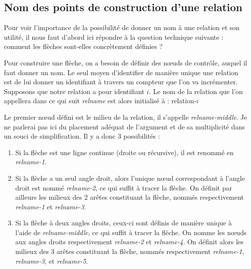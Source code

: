 \documentclass[a4paper,11pt]{report}
\newcommand{\inputTikZ}[1]{%
  }%
\newcommand{\inputTikZ}[1]{%
    \texttt{[image: fig/\#1.pdf]}%
  }%
\begin{document}
\subsection{Nom des points de construction d'une relation}\label{ss.relptname}

Pour voir l'importance de la possibilité de donner un nom à une relation et son utilité, il nous faut d'abord ici répondre à la question technique suivante : comment les flèches sont-elles concrètement définies ?

Pour construire une flèche, on a besoin de définir des n\oe{}uds de contrôle, auquel il faut donner un nom. Le seul moyen d'identifier de manière unique une relation est de lui donner un identifiant à travers un compteur que l'on va incrémenter. Supposons que notre relation a pour identifiant $i$. Le nom de la relation que l'on appellera dans ce qui suit {\it relname} est alors initialisé à : relation-$i$

Le premier n\oe{}ud défini est le milieu de la relation, il s'appelle {\it relname-middle}. Je ne parlerai pas ici du placement adéquat de l'argument et de sa multiplicité dans un souci de simplification. Il y a donc 3 possibilités :

\begin{enumerate}
\item Si la flèche est une ligne continue (droite ou récursive), il est renommé en {\it relname-1}.

\begin{center}
\inputTikZ{figure25}
\end{center}
\item Si la flèche a un seul angle droit, alors l'unique n\oe{}ud correspondant à l'angle droit est nommé {\it relname-2}, ce qui suffit à tracer la flèche. On définit par ailleurs les milieux des 2 arêtes constituant la flèche, nommés respectivement {\it relname-1} et {\it relname-3}.

\begin{center}
\inputTikZ{figure26}
\end{center}
\item Si la flèche à deux angles droits, ceux-ci sont définis de manière unique à l'aide de {\it relname-middle}, ce qui suffit à tracer la flèche. On nomme les n\oe{}uds aux angles droits respectivement {\it relname-2} et {\it relname-4}. On définit alors les milieux des 3 arêtes constituant la flèche, nommés respectivement {\it relname-1}, {\it relname-3}, et {\it relname-5}.

\begin{center}
\inputTikZ{figure27}
\end{center}
\end{enumerate}
\end{document}
